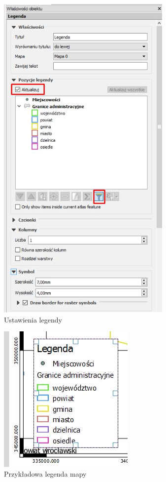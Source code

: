 \documentclass[12pt,a4paper]{book}
\begin{document}
\begin{center}
\begin{figure}
\includegraphics[width=8.502cm,height=16.535cm]{008-ustawienia-legendy.png}
\caption{Ustawienia legendy}
\end{figure}
\end{center}


\begin{center}
\begin{figure}
\includegraphics[width=6.639cm,height=7.267cm]{008-legenda-przyklad.png}
\caption{Przykładowa legenda mapy}
\end{figure}
\end{center}
\end{document}
